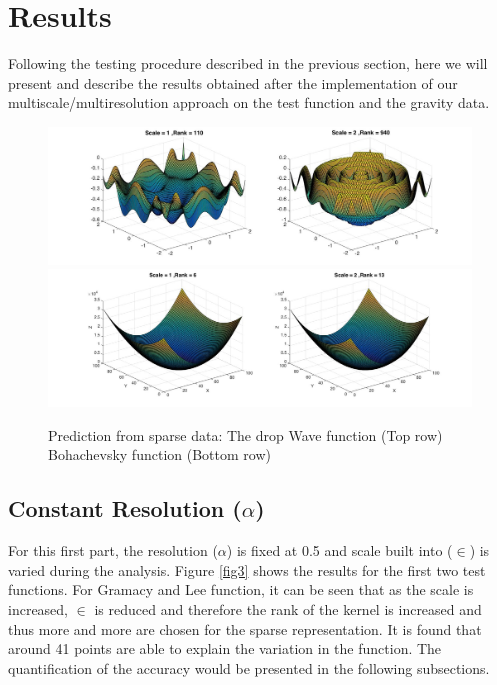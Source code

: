 \documentclass[procedia]{easychair}
\begin{document}
\section{Results}

Following the testing procedure described in the previous section, here we will present and describe the results obtained after the implementation of our multiscale/multiresolution approach on the test function and the gravity data. 



\begin{figure}[]  %
	\centering
	\includegraphics[width=4.5in]{fig_wave.jpg}
	\includegraphics[width=4.5in]{fig_boha.jpg}
	\caption[Optional caption]{Prediction from sparse data: The drop Wave function (Top row) Bohachevsky function (Bottom row)}
	\label{fig4} %
\end{figure}





\subsection{Constant Resolution ($\alpha$)}

For this first part, the resolution ($\alpha$) is fixed at 0.5 and scale built into ($\in$) is varied during the analysis. Figure \ref{fig3} shows the results for the first two test functions. For Gramacy and Lee function, it can be seen that as the scale is increased, $\in$ is reduced and therefore the rank of the kernel is increased and thus more and more are chosen for the sparse representation. It is found that around 41 points are able to explain the variation in the function. The quantification of the accuracy would be presented in the following subsections. 
\end{document}
